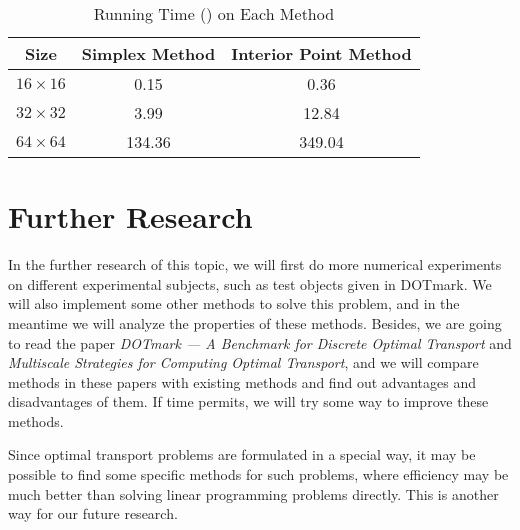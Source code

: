 \documentclass[english]{pkupaper}
\begin{document}
\begin{table}[h]
\caption{Running Time (\Si{\second}) on Each Method} \label{Tbl:RunningTime}
\centering
\begin{tabular}{|c|c|c|}
	\hline
Size	& Simplex Method & Interior Point Method\\
	\hline
	$16\times 16$ & 0.15 & 0.36\\
	\hline
	$32\times 32$ & 3.99 & 12.84 \\
	\hline
	$64\times 64$ & 134.36 & 349.04 \\
	\hline
\end{tabular}
\end{table}

\section{Further Research}

In the further research of this topic, we will first do more numerical experiments on different experimental subjects, such as test objects given in DOTmark. We will also implement some other methods  to solve this problem, and in the meantime we will analyze the properties of these methods. Besides, we are going to read the paper \emph{DOTmark — A Benchmark for Discrete Optimal Transport} and \emph{Multiscale Strategies for Computing Optimal Transport}, and we will compare methods in these papers with existing methods and find out advantages and disadvantages of them. If time permits, we will try some way to improve these methods.

Since optimal transport problems are formulated in a special way, it may be possible to find some specific methods for such problems, where efficiency may be much better than solving linear programming problems directly. This is another way for our future research.
\end{document}
